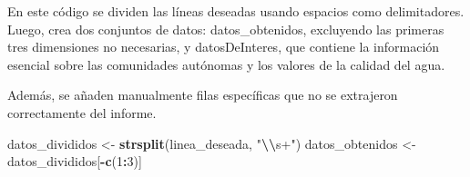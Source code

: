 \documentclass[
]{article}
\newenvironment{Shaded}{\begin{snugshade}}{\end{snugshade}}
\newcommand{\DecValTok}[1]{\textcolor[rgb]{0.00,0.00,0.81}{#1}}
\newcommand{\FunctionTok}[1]{\textcolor[rgb]{0.13,0.29,0.53}{\textbf{#1}}}
\newcommand{\NormalTok}[1]{#1}
\newcommand{\OtherTok}[1]{\textcolor[rgb]{0.56,0.35,0.01}{#1}}
\newcommand{\SpecialCharTok}[1]{\textcolor[rgb]{0.81,0.36,0.00}{\textbf{#1}}}
\newcommand{\StringTok}[1]{\textcolor[rgb]{0.31,0.60,0.02}{#1}}
\begin{document}
En este código se dividen las líneas deseadas usando espacios como
delimitadores. Luego, crea dos conjuntos de datos: datos\_obtenidos,
excluyendo las primeras tres dimensiones no necesarias, y
datosDeInteres, que contiene la información esencial sobre las
comunidades autónomas y los valores de la calidad del agua.

Además, se añaden manualmente filas específicas que no se extrajeron
correctamente del informe.

\begin{Shaded}
\begin{Highlighting}[]
\NormalTok{datos\_divididos }\OtherTok{\textless{}{-}} \FunctionTok{strsplit}\NormalTok{(linea\_deseada, }\StringTok{"}\SpecialCharTok{\textbackslash{}\textbackslash{}}\StringTok{s+"}\NormalTok{)}
\NormalTok{datos\_obtenidos }\OtherTok{\textless{}{-}}\NormalTok{ datos\_divididos[}\SpecialCharTok{{-}}\FunctionTok{c}\NormalTok{(}\DecValTok{1}\SpecialCharTok{:}\DecValTok{3}\NormalTok{)]}


\end{Highlighting}
\end{Shaded}
\end{document}
